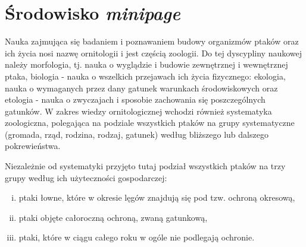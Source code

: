 \documentclass[a4paper,12pt,twoside]{article}
\begin{document}
\section{Środowisko \emph{minipage}}

Nauka zajmująca się badaniem i poznawaniem budowy organizmów ptaków oraz ich życia nosi nazwę ornitologii i jest częścią zoologii. Do tej dyscypliny naukowej należy morfologia, tj. nauka o wyglądzie i budowie zewnętrznej i wewnętrznej ptaka, biologia - nauka o wszelkich przejawach ich życia fizycznego: ekologia, nauka o wymaganych przez dany gatunek warunkach środowiskowych oraz etologia - nauka o zwyczajach i sposobie zachowania się poszczególnych gatunków. W zakres wiedzy ornitologicznej wchodzi również systematyka zoologiczna, polegająca na podziale wszystkich ptaków na grupy systematyczne (gromada, rząd, rodzina, rodzaj, gatunek) według bliższego lub dalszego pokrewieństwa.

\medskip

\begin{minipage}{8cm}
Niezależnie od systematyki przyjęto tutaj podział wszystkich ptaków na trzy grupy według ich użyteczności gospodarczej:
\begin{enumerate}[i)]
\item ptaki łowne, które w okresie lęgów znajdują się pod tzw. ochroną okresową,
\item ptaki objęte całoroczną ochroną, zwaną gatunkową,
\item ptaki, które w ciągu całego roku w ogóle nie podlegają ochronie.
\end{enumerate}
\end{minipage}

\vspace{1cm}
\end{document}
